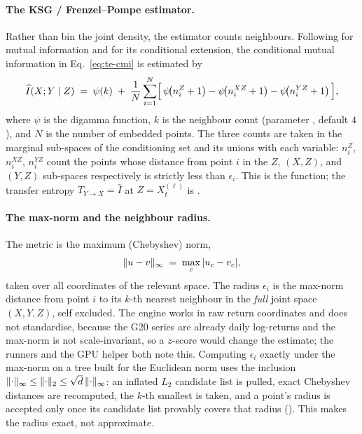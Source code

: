 \paragraph{The KSG / Frenzel--Pompe estimator.}
Rather than bin the joint density, the estimator counts neighbours. Following
\citet{kraskov2004} for mutual information and \citet{frenzel2007} for its conditional
extension, the conditional mutual information in Eq.~\eqref{eq:te-cmi} is estimated by
\begin{equation}
\label{eq:ksg-cmi}
\widehat{I}(X;Y\mid Z) \;=\; \psi(k)
  \;+\; \frac{1}{N}\sum_{i=1}^{N}\Bigl[\,
    \psi\!\bigl(n^Z_i+1\bigr) - \psi\!\bigl(n^{XZ}_i+1\bigr) - \psi\!\bigl(n^{YZ}_i+1\bigr)
  \,\Bigr],
\end{equation}
where $\psi$ is the digamma function, $k$ is the neighbour count (parameter ,
default $4$), and $N$ is the number of embedded points. The three counts are taken in
the marginal sub-spaces of the conditioning set and its unions with each variable:
$n^Z_i$, $n^{XZ}_i$, $n^{YZ}_i$ count the points whose distance from point $i$ in the
$Z$, $(X,Z)$, and $(Y,Z)$ sub-spaces respectively is strictly less than $\epsilon_i$.
This is the  function; the transfer entropy
$T_{Y\to X}=\widehat{I}$ at $Z=X_t^{(\ell)}$ is .

\paragraph{The max-norm and the neighbour radius.}
The metric is the maximum (Chebyshev) norm,
\begin{equation}
\label{eq:maxnorm}
\lVert u-v \rVert_\infty \;=\; \max_{c} \,\lvert u_c - v_c \rvert,
\end{equation}
taken over all coordinates of the relevant space. The radius $\epsilon_i$ is the
max-norm distance from point $i$ to its $k$-th nearest neighbour in the \emph{full}
joint space $(X,Y,Z)$, self excluded. The engine works in raw return coordinates and
does not standardise, because the G20 series are already daily log-returns and the
max-norm is not scale-invariant, so a $z$-score would change the estimate; the runners
and the GPU helper both note this. Computing $\epsilon_i$ exactly under the max-norm on
a tree built for the Euclidean norm uses the inclusion $\lVert \cdot \rVert_\infty \le
\lVert \cdot \rVert_2 \le \sqrt{d}\,\lVert \cdot \rVert_\infty$: an inflated $L_2$ candidate list is
pulled, exact Chebyshev distances are recomputed, the $k$-th smallest is taken, and a
point's radius is accepted only once its candidate list provably covers that radius
(). This makes the radius exact, not approximate.

